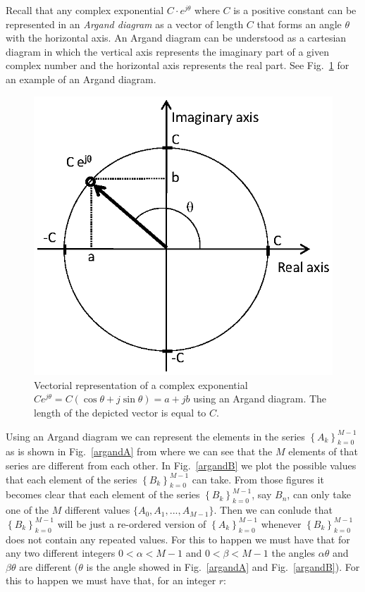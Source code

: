 \documentclass[a4paper,11pt,oneside]{article}
\begin{document}
Recall that any complex exponential $C \cdot e^{j\theta}$ where $C$ is a positive constant can be represented in an \emph{Argand diagram} as a vector of length $C$ that forms an angle $\theta$ with the horizontal axis. An Argand diagram can be understood as a cartesian diagram in which the vertical axis represents the imaginary part of a given complex number and the horizontal axis represents the real part. See Fig.~\ref{arganddiagram} for an example of an Argand diagram.


\begin{figure}[h!]
\centering
\includegraphics[width=.6\textwidth]{arganddiagram.eps}
\caption{Vectorial representation of a complex exponential $Ce^{j\theta}=C(\cos \theta + j\sin \theta)=a+jb$ using an Argand diagram. The length of the depicted vector is equal to $C$.}
\label{arganddiagram}
\end{figure}


Using an Argand diagram we can represent the elements in the series  $\left\{A_{k}\right\}_{k=0}^{M-1}$ as is shown in Fig.~\ref{argandA} from where we can see that the $M$ elements of that series are different from each other. In Fig.~\ref{argandB} we plot the possible values that each element of the series $\left\{B_{k}\right\}_{k=0}^{M-1}$ can take. From those figures it becomes clear that each element of the series $\left\{B_{k}\right\}_{k=0}^{M-1}$, say $B_{n}$, can only take one of the $M$ different values $\{A_0,A_1,...,A_{M-1}\}$. Then we can conlude that $\left\{B_{k}\right\}_{k=0}^{M-1}$ will be just a re-ordered version of $\left\{A_{k}\right\}_{k=0}^{M-1}$ whenever $\left\{B_{k}\right\}_{k=0}^{M-1}$ does not contain any repeated values. For this to happen we must have that for any two different integers $0<\alpha<M-1$ and $0<\beta<M-1$ the angles $\alpha\theta$ and $\beta\theta$ are different ($\theta$ is the angle showed in Fig.~\ref{argandA} and Fig.~\ref{argandB}). For this to happen we must have that, for an integer $r$:
\end{document}
